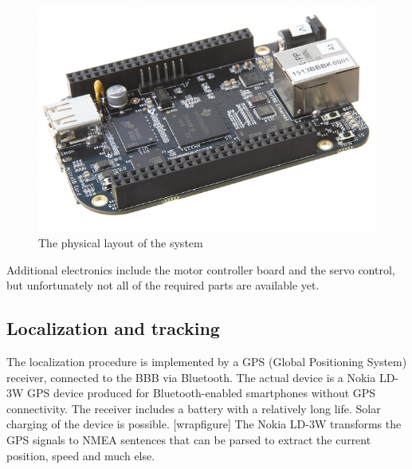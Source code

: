 \begin{figure}[H]
	\centering
	\includegraphics[width=1\textwidth]{img2/BeagleBone}
	\caption{The physical layout of the system}
	\label{fig:PhysicalLayout}
\end{figure}

Additional electronics include the motor controller board and the servo control, but unfortunately not all of the required parts are available yet.

\subsection{Localization and tracking}

The localization procedure is implemented by a GPS (Global Positioning System) receiver, connected to the BBB via Bluetooth. The actual device is a Nokia LD-3W GPS device produced for Bluetooth-enabled smartphones without GPS connectivity. The receiver includes a battery with a relatively long life. Solar charging of the device is possible. [wrapfigure]
The Nokia LD-3W transforms the GPS signals to NMEA sentences that can be parsed to extract the current position, speed and much else.